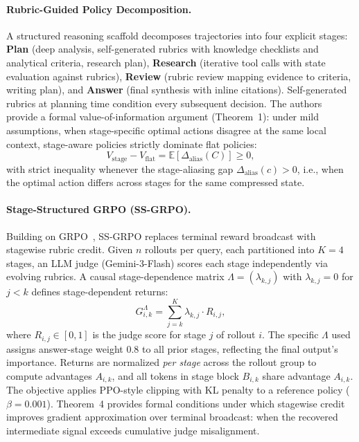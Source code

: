 \documentclass[11pt,a4paper]{article}
\begin{document}
\paragraph{Rubric-Guided Policy Decomposition.}
A structured reasoning scaffold decomposes trajectories into four explicit stages: \textbf{Plan} (deep analysis, self-generated rubrics with knowledge checklists and analytical criteria, research plan), \textbf{Research} (iterative tool calls with state evaluation against rubrics), \textbf{Review} (rubric review mapping evidence to criteria, writing plan), and \textbf{Answer} (final synthesis with inline citations). Self-generated rubrics at planning time condition every subsequent decision. The authors provide a formal value-of-information argument (Theorem~1): under mild assumptions, when stage-specific optimal actions disagree at the same local context, stage-aware policies strictly dominate flat policies:
\begin{equation}
V_{\mathrm{stage}} - V_{\mathrm{flat}} = \mathbb{E}[\Delta_{\mathrm{alias}}(C)] \geq 0,
\end{equation}
with strict inequality whenever the stage-aliasing gap $\Delta_{\mathrm{alias}}(c) > 0$, i.e., when the optimal action differs across stages for the same compressed state.

\paragraph{Stage-Structured GRPO (SS-GRPO).}
Building on GRPO~\cite{grpo}, SS-GRPO replaces terminal reward broadcast with stagewise rubric credit. Given $n$ rollouts per query, each partitioned into $K{=}4$ stages, an LLM judge (Gemini-3-Flash) scores each stage independently via evolving rubrics. A causal stage-dependence matrix $\Lambda = (\lambda_{k,j})$ with $\lambda_{k,j} = 0$ for $j < k$ defines stage-dependent returns:
\begin{equation}
G^{\Lambda}_{i,k} = \sum_{j=k}^{K} \lambda_{k,j} \cdot R_{i,j},
\end{equation}
where $R_{i,j} \in [0,1]$ is the judge score for stage $j$ of rollout $i$. The specific $\Lambda$ used assigns answer-stage weight 0.8 to all prior stages, reflecting the final output's importance. Returns are normalized \textit{per stage} across the rollout group to compute advantages $A_{i,k}$, and all tokens in stage block $B_{i,k}$ share advantage $A_{i,k}$. The objective applies PPO-style clipping with KL penalty to a reference policy ($\beta = 0.001$). Theorem~4 provides formal conditions under which stagewise credit improves gradient approximation over terminal broadcast: when the recovered intermediate signal exceeds cumulative judge misalignment.
\end{document}
